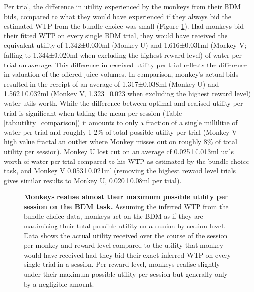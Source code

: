 Per trial, the difference in utility experienced by the monkeys from their BDM bids, compared to what they would have experienced if they always bid the estimated WTP from the bundle choice was small (Figure \ref{fig:optimal_bidding}). Had monkeys bid their fitted WTP on every single BDM trial, they would have received the equivalent utility of 1.342±0.030ml (Monkey U) and 1.616±0.031ml (Monkey V; falling to 1.344±0.020ml when excluding the highest reward level) of water per trial on average. This difference in received utility per trial reflects the difference in valuation of the offered juice volumes. In comparison, monkey’s actual bids resulted in the receipt of an average of 1.317±0.038ml (Monkey U) and 1.562±0.032ml (Monkey V, 1.323±0.023 when excluding the highest reward level) water utils worth. While the difference between optimal and realised utility per trial is significant when taking the mean per session (Table \ref{tab:utility_comparison}) it amounts to only a fraction of a single millilitre of water per trial and roughly 1-2\% of total possible utility per trial (Monkey V high value fractal an outlier where Monkey misses out on roughly 8\% of total utility per session). Monkey U lost out on an average of 0.025±0.013ml utils worth of water per trial compared to his WTP as estimated by the bundle choice task, and Monkey V 0.053±0.021ml (removing the highest reward level trials gives similar results to Monkey U, 0.020±0.08ml per trial).

\begin{figure}[htbp!] 
\centering    

\caption[Monkeys realise almost their maximum possible utility per session on the BDM task.]{\textbf{Monkeys realise almost their maximum possible utility per session on the BDM task.} Assuming the inferred WTP from the bundle choice data, monkeys act on the BDM as if they are maximising their total possible utility on a session by session level. Data shows the actual utility received over the course of the session per monkey and reward level compared to the utility that monkey would have received had they bid their exact inferred WTP on every single trial in a session. Per reward level, monkeys realise slightly under their maximum possible utility per session but generally only by a negligible amount.}
\label{fig:optimal_bidding}
\end{figure}

